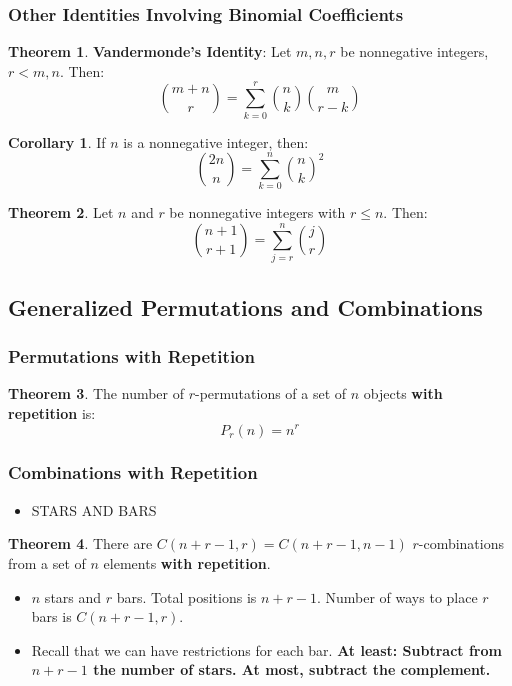 \documentclass[article, 11pt]{article}
\theoremstyle{definition}
\newtheorem{theorem}{Theorem}[subsubsection]
\newtheorem{corollary}{Corollary}[subsubsection]
\begin{document}
    \subsubsection{Other Identities Involving Binomial Coefficients}
    \begin{theorem}
        \textbf{Vandermonde's Identity}: Let $m,n,r$ be nonnegative integers, $r < m,n$. Then:
        \begin{equation*}
            \binom{m + n}{r} = \sum_{k=0}^r \binom{n}{k}\binom{m}{r-k}
        \end{equation*}
    \end{theorem}
    \begin{corollary}
        If $n$ is a nonnegative integer, then:
        \begin{equation*}
            \binom{2n}{n} = \sum_{k=0}^n \binom{n}{k}^2
        \end{equation*}
    \end{corollary}
    \begin{theorem}
        Let $n$ and $r$ be nonnegative integers with $r \leq n$. Then:
        \begin{equation*}
            \binom{n + 1}{r + 1} = \sum_{j=r}^n \binom{j}{r}
        \end{equation*}
    \end{theorem}
    \subsection{Generalized Permutations and Combinations}
    \subsubsection{Permutations with Repetition}
    \begin{theorem}
        The number of $r$-permutations of a set of $n$ objects \textbf{with repetition} is:
        \begin{equation*}
            P_r(n) = n^r
        \end{equation*}
    \end{theorem}
    \subsubsection{Combinations with Repetition}
    \begin{itemize}
        \item STARS AND BARS
    \end{itemize}
    \begin{theorem}
        There are $C(n+r-1, r) = C(n+r-1, n-1)$ $r$-combinations from a set of $n$ elements \textbf{with repetition}.
    \end{theorem}
    \begin{itemize}
        \item $n$ stars and $r$ bars. Total positions is $n+r-1$. Number of ways to place $r$ bars is $C(n+r-1, r)$.
        \item Recall that we can have restrictions for each bar. \textbf{At least: Subtract from $n+r-1$ the number of stars. At most, subtract the complement.} 
    \end{itemize}
\end{document}
